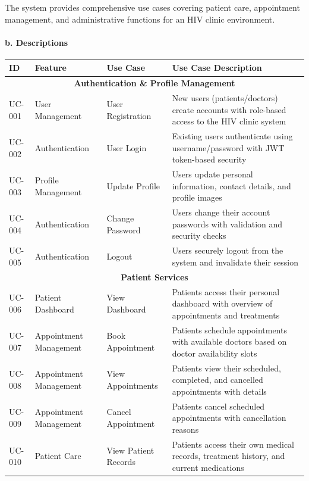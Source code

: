\documentclass[12pt,a4paper]{article}
\begin{document}
The system provides comprehensive use cases covering patient care, appointment management, and administrative functions for an HIV clinic environment.

\paragraph{b. Descriptions}

\begin{longtable}{|p{1cm}|p{3cm}|p{3cm}|p{7cm}|}
\hline
\textbf{ID} & \textbf{Feature} & \textbf{Use Case} & \textbf{Use Case Description} \\
\hline
\multicolumn{4}{|c|}{\textbf{Authentication \& Profile Management}} \\
\hline
UC-001 & User Management & User Registration & New users (patients/doctors) create accounts with role-based access to the HIV clinic system \\
\hline
UC-002 & Authentication & User Login & Existing users authenticate using username/password with JWT token-based security \\
\hline
UC-003 & Profile Management & Update Profile & Users update personal information, contact details, and profile images \\
\hline
UC-004 & Authentication & Change Password & Users change their account passwords with validation and security checks \\
\hline
UC-005 & Authentication & Logout & Users securely logout from the system and invalidate their session \\
\hline
\multicolumn{4}{|c|}{\textbf{Patient Services}} \\
\hline
UC-006 & Patient Dashboard & View Dashboard & Patients access their personal dashboard with overview of appointments and treatments \\
\hline
UC-007 & Appointment Management & Book Appointment & Patients schedule appointments with available doctors based on doctor availability slots \\
\hline
UC-008 & Appointment Management & View Appointments & Patients view their scheduled, completed, and cancelled appointments with details \\
\hline
UC-009 & Appointment Management & Cancel Appointment & Patients cancel scheduled appointments with cancellation reasons \\
\hline
UC-010 & Patient Care & View Patient Records & Patients access their own medical records, treatment history, and current medications \\

\end{longtable}
\end{document}
